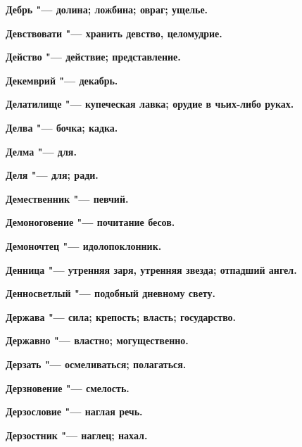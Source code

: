 \begin{mymulticols}{2}
\bfseries Дебрь\normalfont{} "--- долина; ложбина; овраг; ущелье. 




\bfseries Девствовати\normalfont{} "--- хранить девство, целомудрие. 




\bfseries Действо\normalfont{} "--- действие; представление. 




\bfseries Декемврий\normalfont{} "--- декабрь. 




\bfseries Делатилище\normalfont{} "--- купеческая лавка; орудие в чьих-либо руках. 




\bfseries Делва\normalfont{} "--- бочка; кадка. 




\bfseries Делма\normalfont{} "--- для. 




\bfseries Деля\normalfont{} "--- для; ради. 




\bfseries Демественник\normalfont{} "--- певчий. 




\bfseries Демоноговение\normalfont{} "--- почитание бесов. 




\bfseries Демоночтец\normalfont{} "--- идолопоклонник. 




\bfseries Денница\normalfont{} "--- утренняя заря, утренняя звезда; отпадший ангел. 




\bfseries Денносветлый\normalfont{} "--- подобный дневному свету. 




\bfseries Держава\normalfont{} "--- сила; крепость; власть; государство. 




\bfseries Державно\normalfont{} "--- властно; могущественно. 




\bfseries Дерзать\normalfont{} "--- осмеливаться; полагаться. 




\bfseries Дерзновение\normalfont{} "--- смелость. 




\bfseries Дерзословие\normalfont{} "--- наглая речь. 




\bfseries Дерзостник\normalfont{} "--- наглец; нахал. 





\end{mymulticols}
